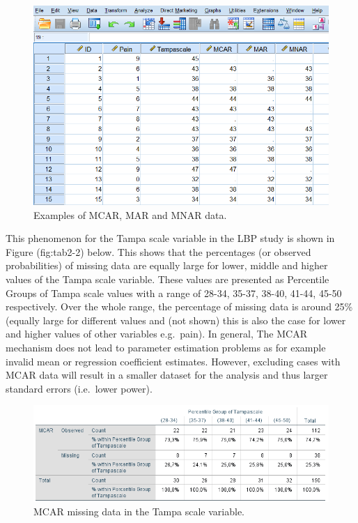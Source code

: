 \documentclass[]{book}
\begin{document}
\begin{figure}

{\centering \includegraphics[width=0.9\linewidth]{images/fig2.7} 

}

\caption{Examples of MCAR, MAR and MNAR data.}\label{fig:fig2-7}
\end{figure}

This phenomenon for the Tampa scale variable in the LBP study is shown
in Figure (fig:tab2-2) below. This shows that the percentages (or
observed probabilities) of missing data are equally large for lower,
middle and higher values of the Tampa scale variable. These values are
presented as Percentile Groups of Tampa scale values with a range of
28-34, 35-37, 38-40, 41-44, 45-50 respectively. Over the whole range,
the percentage of missing data is around 25\% (equally large for
different values and (not shown) this is also the case for lower and
higher values of other variables e.g.~pain). In general, The MCAR
mechanism does not lead to parameter estimation problems as for example
invalid mean or regression coefficient estimates. However, excluding
cases with MCAR data will result in a smaller dataset for the analysis
and thus larger standard errors (i.e.~lower power).

\begin{figure}

{\centering \includegraphics[width=0.9\linewidth]{images/tab2.2} 

}

\caption{MCAR missing data in the Tampa scale variable.}\label{fig:tab2-2}
\end{figure}
\end{document}
